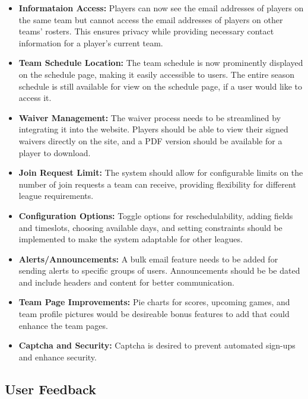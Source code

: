 \documentclass[12pt, titlepage]{article}
\begin{document}
\begin{itemize}
  \item \textbf{Informataion Access:} Players can now see the email addresses of players on the same
  team but cannot access the email addresses of players on other teams' rosters. This ensures privacy
  while providing necessary contact information for a player's current team.
  \item \textbf{Team Schedule Location:} The team schedule is now prominently displayed on the
  schedule page, making it easily accessible to users. The entire season schedule is still available
  for view on the schedule page, if a user would like to access it.
  \item \textbf{Waiver Management:} The waiver process needs to be streamlined by integrating it into the
  website. Players should be able to view their signed waivers directly on the site, and a PDF version
  should be available for a player to download.
  \item \textbf{Join Request Limit:} The system should allow for configurable limits on the number of
  join requests a team can receive, providing flexibility for different league requirements.
  \item \textbf{Configuration Options:} Toggle options for reschedulability, adding fields and
  timeslots, choosing available days, and setting constraints should be implemented to make the system
  adaptable for other leagues.
  \item \textbf{Alerts/Announcements:} A bulk email feature needs to be added for sending alerts to specific
  groups of users. Announcements should be be dated and include headers and content for better
  communication.
  \item \textbf{Team Page Improvements:} Pie charts for scores, upcoming games, and team profile
  pictures would be desireable bonus features to add that could enhance the team pages.
  \item \textbf{Captcha and Security:} Captcha is desired to prevent automated sign-ups and
  enhance security.
\end{itemize}

\subsection{User Feedback}
\end{document}
